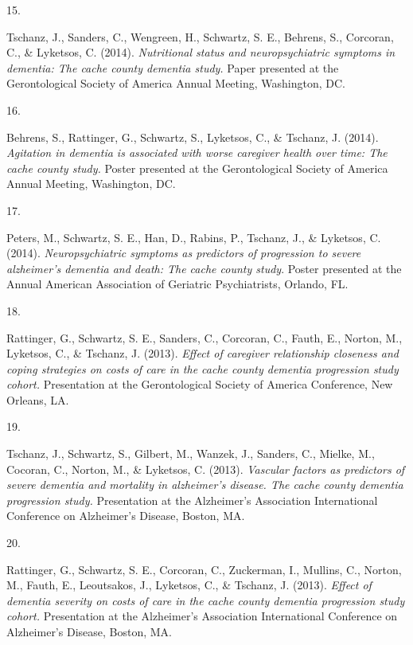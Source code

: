 \documentclass[11pt,a4paper,]{moderncv}
\newlength{\csllabelwidth}
\newcommand{\CSLLeftMargin}[1]{\parbox[t]{\csllabelwidth}{#1}}
\newcommand{\CSLRightInline}[1]{\parbox[t]{\linewidth - \csllabelwidth}{#1}}
\begin{document}
\leavevmode{}%
\CSLLeftMargin{15. }
\CSLRightInline{Tschanz, J., Sanders, C., Wengreen, H., Schwartz, S. E.,
Behrens, S., Corcoran, C., \& Lyketsos, C. (2014). \emph{Nutritional
status and neuropsychiatric symptoms in dementia: The cache county
dementia study.} Paper presented at the Gerontological Society of
America Annual Meeting, Washington, DC.}

\leavevmode{}%
\CSLLeftMargin{16. }
\CSLRightInline{Behrens, S., Rattinger, G., Schwartz, S., Lyketsos, C.,
\& Tschanz, J. (2014). \emph{Agitation in dementia is associated with
worse caregiver health over time: The cache county study.} Poster
presented at the Gerontological Society of America Annual Meeting,
Washington, DC.}

\leavevmode{}%
\CSLLeftMargin{17. }
\CSLRightInline{Peters, M., Schwartz, S. E., Han, D., Rabins, P.,
Tschanz, J., \& Lyketsos, C. (2014). \emph{Neuropsychiatric symptoms as
predictors of progression to severe alzheimer's dementia and death: The
cache county study}. Poster presented at the Annual American Association
of Geriatric Psychiatrists, Orlando, FL.}

\leavevmode{}%
\CSLLeftMargin{18. }
\CSLRightInline{Rattinger, G., Schwartz, S. E., Sanders, C., Corcoran,
C., Fauth, E., Norton, M., Lyketsos, C., \& Tschanz, J. (2013).
\emph{Effect of caregiver relationship closeness and coping strategies
on costs of care in the cache county dementia progression study cohort.}
Presentation at the Gerontological Society of America Conference, New
Orleans, LA.}

\leavevmode{}%
\CSLLeftMargin{19. }
\CSLRightInline{Tschanz, J., Schwartz, S., Gilbert, M., Wanzek, J.,
Sanders, C., Mielke, M., Cocoran, C., Norton, M., \& Lyketsos, C.
(2013). \emph{Vascular factors as predictors of severe dementia and
mortality in alzheimer's disease. The cache county dementia progression
study.} Presentation at the Alzheimer's Association International
Conference on Alzheimer's Disease, Boston, MA.}

\leavevmode{}%
\CSLLeftMargin{20. }
\CSLRightInline{Rattinger, G., Schwartz, S. E., Corcoran, C., Zuckerman,
I., Mullins, C., Norton, M., Fauth, E., Leoutsakos, J., Lyketsos, C., \&
Tschanz, J. (2013). \emph{Effect of dementia severity on costs of care
in the cache county dementia progression study cohort.} Presentation at
the Alzheimer's Association International Conference on Alzheimer's
Disease, Boston, MA.}
\end{document}
